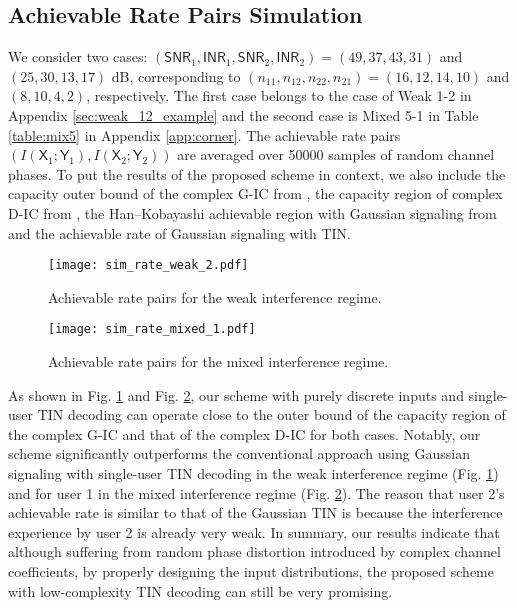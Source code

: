 \documentclass[12pt, draftclsnofoot, onecolumn]{IEEEtran}
\newcommand{\msf}[1]{\mathsf{#1}}
\newcommand{\SNR}{\msf{SNR}}
\newcommand{\INR}{\msf{INR}}
\theoremstyle{definition}
\begin{document}
\subsection{Achievable Rate Pairs Simulation}\label{SIM}

We consider two cases: $(\SNR_1,\INR_1,\SNR_2,\INR_2) = (49,37,43,31)$ and $(25,30,13,17)$ dB, corresponding to $(n_{11},n_{12},n_{22},n_{21})=(16,12,14,10)$ and $(8,10,4,2)$, respectively. The first case belongs to the case of Weak 1-2 in Appendix \ref{sec:weak_12_example} and the second case is Mixed 5-1 in Table \ref{table:mix5} in Appendix \ref{app:corner}. The achievable rate pairs $(I(\msf{X}_1;\msf{Y}_1),I(\msf{X}_2;\msf{Y}_2))$ are averaged over 50000 samples of random channel phases. To put the results of the proposed scheme in context, we also include the capacity outer bound of the complex G-IC from \cite{4675741}, the capacity region of complex D-IC from \cite{doi:10.1002/ett.1287}, the Han–Kobayashi achievable region with Gaussian signaling from \cite{4675741} and the achievable rate of Gaussian signaling with TIN.
\begin{figure}[t!]
	\centering
\texttt{[image: sim\_rate\_weak\_2.pdf]}
\caption{Achievable rate pairs for the weak interference regime.}
\label{fig:sim_1}
\end{figure}

\begin{figure}[t!]
	\centering
\texttt{[image: sim\_rate\_mixed\_1.pdf]}
\caption{Achievable rate pairs for the mixed interference regime.}
\label{fig:sim_2}
\end{figure}

As shown in Fig. \ref{fig:sim_1} and Fig. \ref{fig:sim_2}, our scheme with purely discrete inputs and single-user TIN decoding can operate close to the outer bound of the capacity region of the complex G-IC and that of the complex D-IC for both cases. Notably, our scheme significantly outperforms the conventional approach using Gaussian signaling with single-user TIN decoding in the weak interference regime (Fig. \ref{fig:sim_1}) and for user 1 in the mixed interference regime (Fig. \ref{fig:sim_2}). The reason that user 2's achievable rate is similar to that of the Gaussian TIN is because the interference experience by user 2 is already very weak. In summary, our results indicate that although suffering from random phase distortion introduced by complex channel coefficients, by properly designing the input distributions, the proposed scheme with low-complexity TIN decoding can still be very promising.
\end{document}
